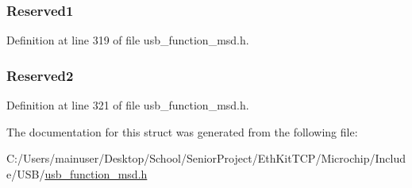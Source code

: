 \subsubsection[{Reserved1}]{ Reserved1}\label{struct_read_capacity_c_b_a0e359e73bbb61ef44681fba3fd463b5d}


Definition at line 319 of file usb\+\_\+function\+\_\+msd.\+h.

\hypertarget{struct_read_capacity_c_b_a5a2395e6b7ac3b0b4d0278f716d1d3fb}{}
\subsubsection[{Reserved2}]{ Reserved2}\label{struct_read_capacity_c_b_a5a2395e6b7ac3b0b4d0278f716d1d3fb}


Definition at line 321 of file usb\+\_\+function\+\_\+msd.\+h.



The documentation for this struct was generated from the following file\+:\begin{DoxyCompactItemize}
\item 
C\+:/\+Users/mainuser/\+Desktop/\+School/\+Senior\+Project/\+Eth\+Kit\+T\+C\+P/\+Microchip/\+Include/\+U\+S\+B/\hyperlink{usb__function__msd_8h}{usb\+\_\+function\+\_\+msd.\+h}\end{DoxyCompactItemize}
